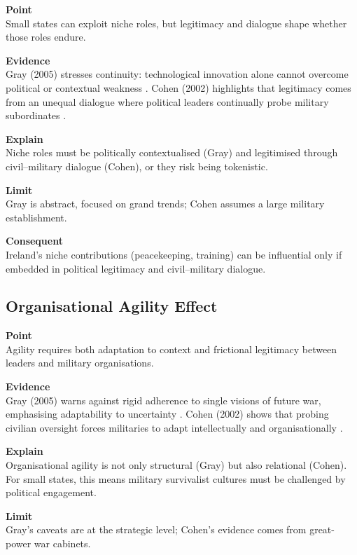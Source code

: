 \textbf{Point} \\
Small states can exploit niche roles, but legitimacy and dialogue shape whether those roles endure.

\textbf{Evidence} \\
Gray (2005) stresses continuity: technological innovation alone cannot overcome political or contextual weakness \parencite{GRAY_2005}.  
Cohen (2002) highlights that legitimacy comes from an unequal dialogue where political leaders continually probe military subordinates \parencite{COHEN_2002}.  

\textbf{Explain} \\
Niche roles must be politically contextualised (Gray) and legitimised through civil--military dialogue (Cohen), or they risk being tokenistic.

\textbf{Limit} \\
Gray is abstract, focused on grand trends; Cohen assumes a large military establishment.

\textbf{Consequent} \\
Ireland’s niche contributions (peacekeeping, training) can be influential only if embedded in political legitimacy and civil--military dialogue.  

\subsection*{Organisational Agility Effect}

\textbf{Point} \\
Agility requires both adaptation to context and frictional legitimacy between leaders and military organisations.

\textbf{Evidence} \\
Gray (2005) warns against rigid adherence to single visions of future war, emphasising adaptability to uncertainty \parencite{GRAY_2005}.  
Cohen (2002) shows that probing civilian oversight forces militaries to adapt intellectually and organisationally \parencite{COHEN_2002}.  

\textbf{Explain} \\
Organisational agility is not only structural (Gray) but also relational (Cohen). For small states, this means military survivalist cultures must be challenged by political engagement.

\textbf{Limit} \\
Gray’s caveats are at the strategic level; Cohen’s evidence comes from great-power war cabinets.

